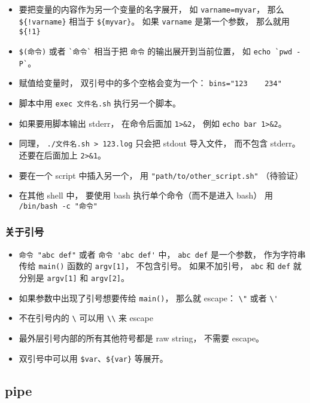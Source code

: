 \begin{itemize}
\item 要把变量的内容作为另一个变量的名字展开， 如 \verb|varname=myvar|， 那么 \verb|${!varname}| 相当于 \verb|${myvar}|。 如果 \verb|varname| 是第一个参数， 那么就用 \verb|${!1}|
\item \verb|$(命令)| 或者 \verb|`命令`| 相当于把 \verb|命令| 的输出展开到当前位置， 如 \verb|echo `pwd -P`|。
\item 赋值给变量时， 双引号中的多个空格会变为一个： \verb|bins="123    234"|
\item 脚本中用 \verb|exec 文件名.sh| 执行另一个脚本。
\item 如果要用脚本输出 stderr， 在命令后面加 \verb|1>&2|， 例如 \verb|echo bar 1>&2|。
\item 同理， \verb|./文件名.sh > 123.log| 只会把 stdout 导入文件， 而不包含 stderr。 还要在后面加上 \verb|2>&1|。
\item 要在一个 script 中插入另一个， 用 \verb|"path/to/other_script.sh"| （待验证）
\item 在其他 shell 中， 要使用 bash 执行单个命令（而不是进入 bash） 用 \verb|/bin/bash -c "命令"|
\end{itemize}

\subsubsection{关于引号}
\begin{itemize}
\item \verb|命令 "abc def"| 或者 \verb|命令 'abc def'| 中， \verb|abc def| 是一个参数， 作为字符串传给 \verb|main()| 函数的 \verb|argv[1]|， 不包含引号。 如果不加引号， \verb|abc| 和 \verb|def| 就分别是 \verb|argv[1]| 和 \verb|argv[2]|。
\item 如果参数中出现了引号想要传给 \verb|main()|， 那么就 escape： \verb|\"| 或者 \verb|\'|
\item 不在引号内的 \verb|\| 可以用 \verb|\\| 来 escape
\item 最外层引号内部的所有其他符号都是 raw string， 不需要 escape。
\item 双引号中可以用 \verb|$var|、\verb|${var}| 等展开。
\end{itemize}

\subsection{pipe}
\

